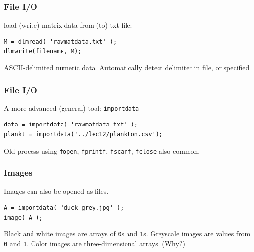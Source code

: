 \documentclass[11pt]{beamer}
\begin{document}
\begin{frame}[fragile]
  \frametitle{File I/O}
  \Enlarge

  \begin{enumerate}
  \myitem  load (write) matrix data from (to) txt file: 
  \end{enumerate}
  \begin{Verbatim}
M = dlmread( 'rawmatdata.txt' );
dlmwrite(filename, M);
  \end{Verbatim}
  \pause
  \begin{enumerate}
  \myitem  ASCII-delimited numeric data. 
  \myitem  Automatically detect delimiter in file, or specified
  \end{enumerate}
\end{frame}

\begin{frame}[fragile]
  \frametitle{File I/O}
  \Enlarge

  \begin{enumerate}
  \myitem  A more advanced (general) tool:  \texttt{importdata}
  \end{enumerate}
  \begin{Verbatim}
data = importdata( 'rawmatdata.txt' );
plankt = importdata('../lec12/plankton.csv');
  \end{Verbatim}
  \pause
  \begin{enumerate}
  \myitem  Old process using \texttt{fopen}, \texttt{fprintf}, \texttt{fscanf}, \texttt{fclose} also common.
  \end{enumerate}
\end{frame}


\begin{frame}[fragile]
  \frametitle{Images}
  \Enlarge

  \begin{enumerate}
  \myitem  Images can also be opened as files.
  \end{enumerate}
  \begin{Verbatim}
A = importdata( 'duck-grey.jpg' );
image( A );
  \end{Verbatim}
  \pause
  \begin{enumerate}
  \myitem  Black and white images are arrays of \texttt{0}s and \texttt{1}s.
  \myitem  Greyscale images are values from \texttt{0} and \texttt{1}.
  \myitem  Color images are three-dimensional arrays.  (Why?) 
  \end{enumerate}
\end{frame}
\end{document}
